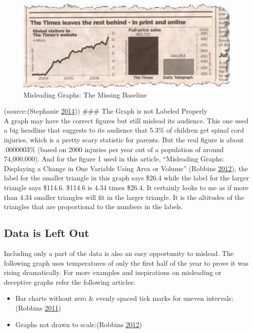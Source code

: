 \documentclass[]{book}
\providecommand{\tightlist}{%
  \setlength{\itemsep}{0pt}\setlength{\parskip}{0pt}}
\begin{document}
\begin{figure}
\centering
\includegraphics{images/misleading-graph-2.jpg}
\caption{Misleading Graphs: The Missing Baseline}
\end{figure}

(source:(Stephanie \protect\hyperlink{ref-missing_baseline}{2014}))
\#\#\# The Graph is not Labeled Properly\\
A graph may have the correct figures but still mislead its audience. This one used a big headline that suggests to its audience that 5.3\% of children get spinal cord injuries, which is a pretty scary statistic for parents. But the real figure is about .0000003\% (based on 2000 injuries per year out of a population of around 74,000,000). And for the figure 1 used in this article, ``Misleading Graphs: Displaying a Change in One Variable Using Area or Volume'' (Robbins \protect\hyperlink{ref-scaling_issues}{2012}), the label for the smaller triangle in this graph says \$26.4 while the label for the larger triangle says \$114.6. \$114.6 is 4.34 times \$26.4. It certainly looks to me as if more than 4.34 smaller triangles will fit in the larger triangle. It is the altitudes of the triangles that are proportional to the numbers in the labels.

\hypertarget{data-is-left-out}{%
\subsection{Data is Left Out}\label{data-is-left-out}}

Including only a part of the data is also an easy opportunity to mislead. The following graph uses temperatures of only the first half of the year to prove it was rising dramatically. For more examples and inspirations on misleading or deceptive graphs refer the following articles:

\begin{itemize}
\tightlist
\item
  Bar charts without zero \& evenly spaced tick marks for uneven intervals: (Robbins \protect\hyperlink{ref-whats_wrong}{2011})
\item
  Graphs not drawn to scale:(Robbins \protect\hyperlink{ref-scaling_issues}{2012})
\end{itemize}
\end{document}
